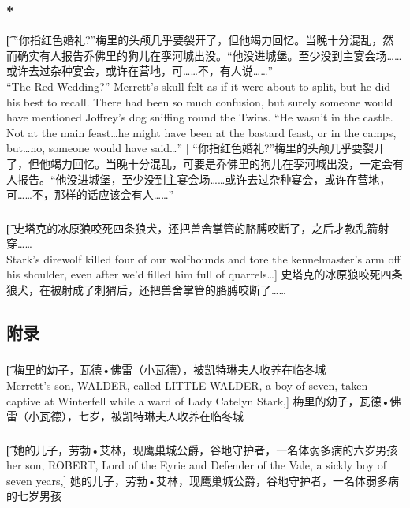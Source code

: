 \documentclass[12pt,a4paper]{article}
\begin{document}
\subsubsection{\color{red}*}\t[
	 “你指红色婚礼?”梅里的头颅几乎要裂开了，但他竭力回忆。当晚十分混乱，然而确实有人报告乔佛里的狗儿在孪河城出没。“他没进城堡。至少没到主宴会场……或许去过杂种宴会，或许在营地，可……不，有人说……”\\
	 “The Red Wedding?” Merrett's skull felt as if it were about to split, but he did his best to recall. There had been so much confusion, but surely someone would have mentioned Joffrey's dog sniffing round the Twins. “He wasn't in the castle. Not at the main feast\ldots he might have been at the bastard feast, or in the camps, but\ldots  no, someone would have said\ldots” ]
	 “你指红色婚礼?”梅里的头颅几乎要裂开了，但他竭力回忆。当晚十分混乱，可要是乔佛里的狗儿在孪河城出没，一定会有人报告。“他没进城堡，至少没到主宴会场……或许去过杂种宴会，或许在营地，可……不，那样的话应该会有人……”
	 
\subsubsection{}\t[
	史塔克的冰原狼咬死四条狼犬，还把兽舍掌管的胳膊咬断了，之后才教乱箭射穿……\\
	Stark's direwolf killed four of our wolfhounds and tore the kennelmaster's arm off his shoulder, even after we'd filled him full of quarrels\ldots ]
	史塔克的冰原狼咬死四条狼犬，在被射成了刺猬后，还把兽舍掌管的胳膊咬断了……
	 	
\subsection{附录}	 
\subsubsection{}\t[
	梅里的幼子，{\large 瓦德•佛雷}（小瓦德），被凯特琳夫人收养在临冬城\\
	Merrett's son, WALDER, called LITTLE WALDER, a boy of seven, taken captive at Winterfell while a ward of Lady Catelyn Stark,]
	梅里的幼子，{\large 瓦德•佛雷（小瓦德）}，七岁，被凯特琳夫人收养在临冬城

\subsubsection{}\t[
	她的儿子，{\large 劳勃•艾林，现鹰巢城公爵}，谷地守护者，一名体弱多病的六岁男孩\\
	her son, ROBERT, Lord of the Eyrie and Defender of the Vale, a sickly boy of seven years,]
	她的儿子，{\large 劳勃•艾林}，现鹰巢城公爵，谷地守护者，一名体弱多病的七岁男孩
	
\end{document}

